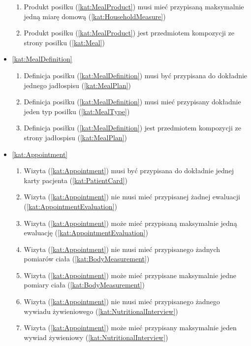 \begin{itemize}[label={\textbf{Reguły dla}}, wide, labelwidth=!, labelindent=0pt]
\begin{enumerate}[label={\textbf{REG/\protect\threedigits{\arabic{enumi}}}}, wide, labelwidth=!, align=left, leftmargin=3cm, resume]
        \item Produkt posiłku (\ref{kat:MealProduct}) musi mieć przypisaną maksymalnie jedną miarę domową (\ref{kat:HouseholdMeasure})
        \item Produkt posiłku (\ref{kat:MealProduct}) jest przedmiotem kompozycji ze strony posiłku (\ref{kat:Meal})
    \end{enumerate}
    \item\ref{kat:MealDefinition}
    \begin{enumerate}[label={\textbf{REG/\protect\threedigits{\arabic{enumi}}}}, wide, labelwidth=!, align=left, leftmargin=3cm, resume]
        \item Definicja posiłku (\ref{kat:MealDefinition}) musi być przypisana do dokładnie jednego jadłospisu (\ref{kat:MealPlan})
        \item Definicja posiłku (\ref{kat:MealDefinition}) musi mieć przypisany dokładnie jeden typ posiłku (\ref{kat:MealType})
        \item Definicja posiłku (\ref{kat:MealDefinition}) jest przedmiotem kompozycji ze strony jadłospisu (\ref{kat:MealPlan})
    \end{enumerate}
    \item\ref{kat:Appointment}
    \begin{enumerate}[label={\textbf{REG/\protect\threedigits{\arabic{enumi}}}}, wide, labelwidth=!, align=left, leftmargin=3cm, resume]
        \item Wizyta (\ref{kat:Appointment}) musi być przypisana do dokładnie jednej karty pacjenta (\ref{kat:PatientCard})
        \item Wizyta (\ref{kat:Appointment}) nie musi mieć przypisanej żadnej ewaluacji (\ref{kat:AppointmentEvaluation})
        \item Wizyta (\ref{kat:Appointment}) może mieć przypisaną maksymalnie jedną ewaluację (\ref{kat:AppointmentEvaluation})
        \item Wizyta (\ref{kat:Appointment}) nie musi mieć przypisanego żadnych pomiarów ciała (\ref{kat:BodyMeasurement})
        \item Wizyta (\ref{kat:Appointment}) może mieć przypisane maksymalnie jedne pomiary ciała (\ref{kat:BodyMeasurement})
        \item Wizyta (\ref{kat:Appointment}) nie musi mieć przypisanego żadnego wywiadu żywieniowego (\ref{kat:NutritionalInterview})
        \item Wizyta (\ref{kat:Appointment}) może mieć przypisany maksymalnie jeden wywiad żywieniowy (\ref{kat:NutritionalInterview})

\end{enumerate}
\end{itemize}
